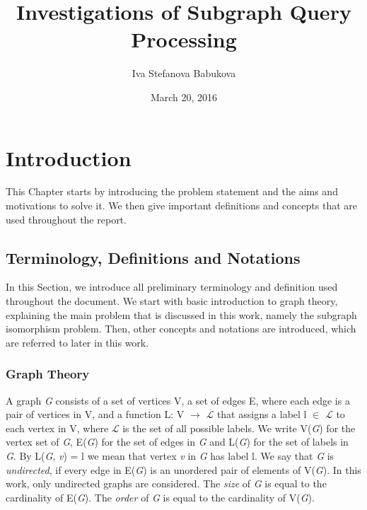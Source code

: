 \documentclass{l4proj}
\newcommand{\Lagr}{\mathcal{L}}
\begin{document}
\title{Investigations of Subgraph Query Processing}
\author{Iva Stefanova Babukova}
\date{March 20, 2016}
\maketitle

\begin{abstract}


\end{abstract}

\educationalconsent
%
%
\tableofcontents
\chapter{Introduction}
\label{ch:introduction}

This Chapter starts by introducing the problem statement and the aims and motivations to solve it. We then give important definitions and concepts that are used throughout the report. 

\section{Terminology, Definitions and Notations}
\label{sec:theory}
In this Section, we introduce all preliminary terminology and definition used throughout the document. We start with basic introduction to graph theory, explaining the main problem that is discussed in this work, namely the subgraph isomorphism problem. Then, other concepts and notations are introduced, which are referred to later in this work.

\subsection{Graph Theory}
\label{sec:graphTheory}

A graph \emph{G} consists of a set of vertices V, a set of edges E, where each edge is a pair of vertices in V, and a function L: V $\rightarrow$ $\Lagr$ that assigns a label l $\in$ $\Lagr$ to each vertex in V, where $\Lagr$ is the set of all possible labels. We write V(\emph{G}) for the vertex set of \emph{G}, E(\emph{G}) for the set of edges in \emph{G} and L(\emph{G}) for the set of labels in \emph{G}. By L(\emph{G}, \emph{v}) = l we mean that vertex \emph{v} in \emph{G} has label l.
We say that \emph{G} is \emph{undirected}, if every edge in E(\emph{G}) is an unordered pair of elements of V(\emph{G}). In this work, only undirected graphs are considered. The \emph{size} of \emph{G} is equal to the cardinality of E(\emph{G}). The \emph{order} of \emph{G} is equal to the cardinality of V(\emph{G}).
\end{document}
